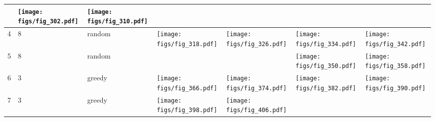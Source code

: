 \documentclass[oneside,canadian,landscape]{article}
\begin{document}
\begin{center}
\begin{longtable}{|l|l|l||l|l|l|l|}
\begin{minipage}{3.5cm}
\end{minipage}
&\begin{minipage}{3.5cm}
\texttt{[image: figs/fig\_302.pdf]}
\end{minipage}
&\begin{minipage}{3.5cm}
\texttt{[image: figs/fig\_310.pdf]}
\end{minipage}
\\ \hline
4&8&random&\begin{minipage}{3.5cm}
\texttt{[image: figs/fig\_318.pdf]}
\end{minipage}
&\begin{minipage}{3.5cm}
\texttt{[image: figs/fig\_326.pdf]}
\end{minipage}
&\begin{minipage}{3.5cm}
\texttt{[image: figs/fig\_334.pdf]}
\end{minipage}
&\begin{minipage}{3.5cm}
\texttt{[image: figs/fig\_342.pdf]}
\end{minipage}
\\ \hline
5&8&random&&&\begin{minipage}{3.5cm}
\texttt{[image: figs/fig\_350.pdf]}
\end{minipage}
&\begin{minipage}{3.5cm}
\texttt{[image: figs/fig\_358.pdf]}
\end{minipage}
\\ \hline
6&3&greedy&\begin{minipage}{3.5cm}
\texttt{[image: figs/fig\_366.pdf]}
\end{minipage}
&\begin{minipage}{3.5cm}
\texttt{[image: figs/fig\_374.pdf]}
\end{minipage}
&\begin{minipage}{3.5cm}
\texttt{[image: figs/fig\_382.pdf]}
\end{minipage}
&\begin{minipage}{3.5cm}
\texttt{[image: figs/fig\_390.pdf]}
\end{minipage}
\\ \hline
7&3&greedy&\begin{minipage}{3.5cm}
\texttt{[image: figs/fig\_398.pdf]}
\end{minipage}
&\begin{minipage}{3.5cm}
\texttt{[image: figs/fig\_406.pdf]}
\end{minipage}

\end{longtable}
\end{center}
\end{document}
